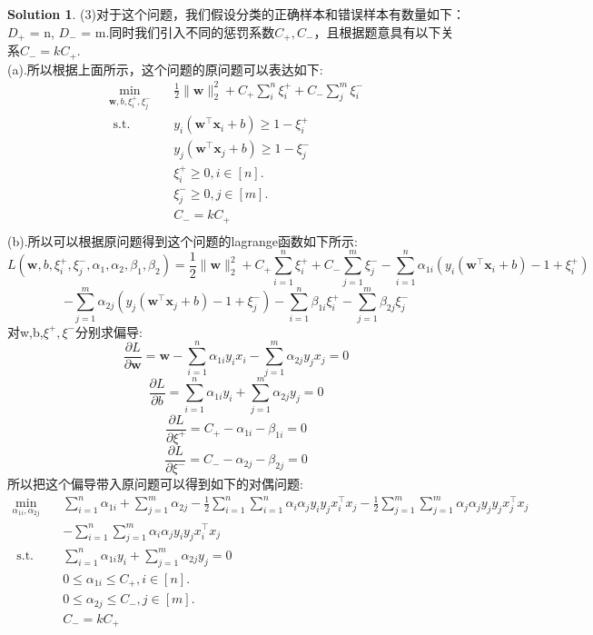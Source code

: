\documentclass[a4paper,UTF8]{article}
\numberwithin{equation}{section}
\theoremstyle{definition}
\newtheorem*{solution}{Solution}
\newcommand{\vct}[1]{\boldsymbol{#1}} %
\newcommand{\vw}{\vct{w}}
\newcommand{\vx}{\vct{x}}
\begin{document}
\begin{solution}
(3)对于这个问题，我们假设分类的正确样本和错误样本有数量如下：$D_{+}$ = n, $D_{-}$ = m.同时我们引入不同的惩罚系数$C_{+},C_{-}$，且根据题意具有以下关系$C_{-} = kC_{+}$.\\
(a).所以根据上面所示，这个问题的原问题可以表达如下:
\begin{equation}
    \begin{aligned}
        \min _{\vw, b, \xi_{i}^{+}, \xi_{j}^{-}} \quad & \frac{1}{2}\|\vw\|_{2}^{2}+ C_{+}\sum_{i}^{n}\xi_i^{+} + C_{-}\sum_{j}^{m}\xi_i^{-} \\
        \text { s.t. } \quad & y_{i}\left(\vw^{\top} \vx_{i}+b\right) \geq 1- \xi_{i}^{+} \\
        & y_{j}\left(\vw^{\top} \vx_{j}+b\right) \geq 1- \xi_{j}^{-} \\
        & \xi_{i}^{+} \geq 0, i \in [n] .\\
        & \xi_{j}^{-} \geq 0, j \in [m] .\\
        & C_{-} = kC_{+}\\
    \end{aligned}
\end{equation}
(b).所以可以根据原问题得到这个问题的lagrange函数如下所示:\\
\[  L(\vw, b, \xi_{i}^{+}, \xi_{j}^{-}, \alpha_1, \alpha_2 , \beta_1, \beta_2) = \frac{1}{2}\|\vw\|_{2}^{2} + C_{+} \sum_{i=1}^{n} \xi^{+}_{i}  + C_{-} \sum_{j=1}^{m} \xi^{-}_{j} - \sum_{i=1}^{n} \alpha_{1i}( y_{i}(\vw^{\top} \vx_{i}+b) - 1 + \xi_{i}^{+}) \]
\[- \sum_{j=1}^{m} \alpha_{2j}( y_{j}(\vw^{\top} \vx_{j}+b) - 1 + \xi_{j}^{-})- \sum_{i=1}^{n} \beta_{1i} \xi_{i}^{+} - \sum_{j=1}^{m} \beta_{2j} \xi_{j}^{-}   \]
对w,b,$\xi^{+},\xi^{-}$分别求偏导:\\
\[  \frac{\partial L}{\partial \vw} = \vw  -\sum_{i=1}^{n}\alpha_{1i}y_ix_i -\sum_{j=1}^{m}\alpha_{2j}y_jx_j = 0      \]
\[  \frac{\partial L}{\partial b} = \sum_{i=1}^{n}\alpha_{1i}y_i + \sum_{j=1}^{m}\alpha_{2j} y_j = 0\]
\[  \frac{\partial L}{\partial \xi^{+}} = C_{+} - \alpha_{1i} - \beta_{1i} = 0\]
\[  \frac{\partial L}{\partial \xi^{-}} = C_{-} - \alpha_{2j} - \beta_{2j} = 0\]
所以把这个偏导带入原问题可以得到如下的对偶问题:\\
\begin{equation}
    \begin{aligned}
        \min _{\alpha_{1i},\alpha_{2j}} \quad & \sum_{i=1}^{n}\alpha_{1i} + \sum_{j=1}^{m}\alpha_{2j}  - \frac{1}{2}\sum_{i=1}^{n}\sum_{i=1}^{n}\alpha_i \alpha_j y_i y_j x_i^{\top} x_j - \frac{1}{2}\sum_{j=1}^{m}\sum_{j=1}^{m}\alpha_j \alpha_j y_j y_j x_j^{\top} x_j   \\
        & -\sum_{i=1}^{n}\sum_{j=1}^{m}\alpha_i \alpha_j y_i y_j x_i^{\top} x_j\\
        \text { s.t. } \quad &  \sum_{i=1}^{n}\alpha_{1i}y_i + \sum_{j=1}^{m}\alpha_{2j} y_j = 0\\\
        & 0 \leq \alpha_{1i} \leq C_{+}, i \in [n].\\
        & 0 \leq \alpha_{2j} \leq C_{-}, j \in [m].\\
        & C_{-} = kC_{+}\\
    \end{aligned}
\end{equation}



\end{solution}
\end{document}
